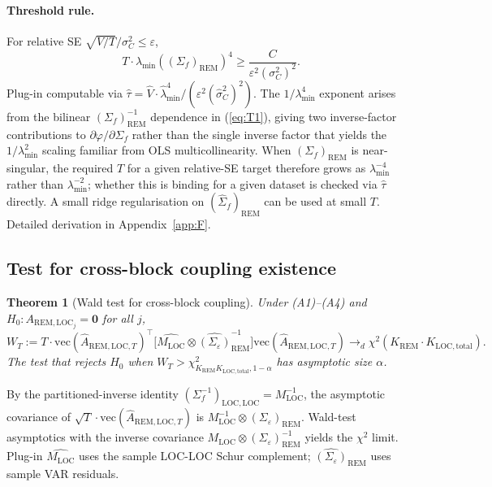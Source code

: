 \documentclass[11pt,letterpaper]{article}
\newtheorem{theorem}{Theorem}
\theoremstyle{remark}
\newcommand{\REM}{\mathrm{REM}}
\newcommand{\LOC}{\mathrm{LOC}}
\newcommand{\Mloc}{M_{\LOC}}
\begin{document}
\paragraph{Threshold rule.} For relative SE $\sqrt{V/T}/\sigma^2_C \le \varepsilon$,
\begin{equation*}
T \cdot \lambda_{\min}((\Sigma_f)_\REM)^4 \ge \frac{C}{\varepsilon^2 (\sigma^2_C)^2}.
\end{equation*}
Plug-in computable via $\widehat{\tau} = \widehat{V} \cdot \widehat{\lambda}_{\min}^4 / (\varepsilon^2 (\widehat{\sigma}^2_C)^2)$. The $1/\lambda_{\min}^4$ exponent arises from the bilinear $(\Sigma_f)_\REM^{-1}$ dependence in (\ref{eq:T1}), giving two inverse-factor contributions to $\partial \varphi / \partial \Sigma_f$ rather than the single inverse factor that yields the $1/\lambda_{\min}^2$ scaling familiar from OLS multicollinearity. When $(\Sigma_f)_\REM$ is near-singular, the required $T$ for a given relative-SE target therefore grows as $\lambda_{\min}^{-4}$ rather than $\lambda_{\min}^{-2}$; whether this is binding for a given dataset is checked via $\widehat\tau$ directly. A small ridge regularisation on $(\widehat{\Sigma}_f)_\REM$ can be used at small $T$. Detailed derivation in Appendix~\ref{app:F}.

\subsection{Test for cross-block coupling existence}\label{sec:test}

\begin{theorem}[Wald test for cross-block coupling]\label{thm:T5}
Under (A1)--(A4) and $H_0: A_{\REM, \LOC_j} = \mathbf{0}$ for all $j$,
\begin{equation*}
W_T := T \cdot \mathrm{vec}(\widehat{A}_{\REM, \LOC, T})^\top \bigl[\widehat{\Mloc} \otimes \widehat{(\Sigma_\varepsilon)}_\REM^{-1}\bigr] \mathrm{vec}(\widehat{A}_{\REM, \LOC, T}) \to_d \chi^2(K_\REM \cdot K_{\LOC, \mathrm{total}}).
\end{equation*}
The test that rejects $H_0$ when $W_T > \chi^2_{K_\REM K_{\LOC, \mathrm{total}}, 1-\alpha}$ has asymptotic size $\alpha$.
\end{theorem}

By the partitioned-inverse identity $(\Sigma_f^{-1})_{\LOC, \LOC} = \Mloc^{-1}$, the asymptotic covariance of $\sqrt{T} \cdot \mathrm{vec}(\widehat{A}_{\REM, \LOC, T})$ is $\Mloc^{-1} \otimes (\Sigma_\varepsilon)_\REM$. Wald-test asymptotics with the inverse covariance $\Mloc \otimes (\Sigma_\varepsilon)_\REM^{-1}$ yields the $\chi^2$ limit. Plug-in $\widehat{\Mloc}$ uses the sample LOC-LOC Schur complement; $\widehat{(\Sigma_\varepsilon)}_\REM$ uses sample VAR residuals.
\end{document}

